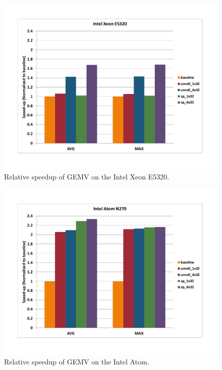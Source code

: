 \documentclass[10pt]{article}
\begin{document}
\begin{figure}[ht]
\begin{center}
\includegraphics[scale=.5]{gemv_xeon_e5320.png}
\end{center}
\caption{Relative speedup of GEMV on the Intel Xeon E5320.}
\label{fig:gemv_xeon}
\end{figure}


\begin{figure}[ht]
\begin{center}
\includegraphics[scale=.5]{gemv_atom.png}
\end{center}
\caption{Relative speedup of GEMV on the Intel Atom.}
\label{fig:gemv_atom}
\end{figure}
\end{document}
